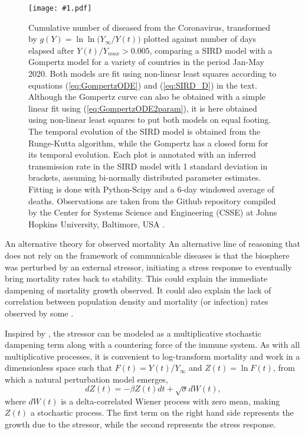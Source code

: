 \documentclass{article}
\newcommand{\insertPdfFig}[3]{
  \begin{figure}[H]
  \centering
  \texttt{[image: \#1.pdf]}
  \caption{#2}
  \label{fig:#1}
  \end{figure}
}
\begin{document}
\insertPdfFig{Gompertz_vs_SIRD_lnln_infty}{Cumulative number of diseased from the Coronavirus, transformed by $g(Y)=\ln{\ln{({Y_{\infty} / Y(t))}}}$ plotted against number of days elapsed after $Y(t) / Y_{max}>0.005$, comparing a SIRD model with a Gompertz model for a variety of countries in the period Jan-May 2020. Both models are fit using non-linear least squares according to equations (\ref{eq:GompertzODE}) and (\ref{eq:SIRD_D}) in the text. Although the Gompertz curve can also be obtained with a simple linear fit using (\ref{eq:GompertzODE2param}), it is here obtained using non-linear least squares to put both models on equal footing. The temporal evolution of the SIRD model is obtained from the Runge-Kutta algorithm, while the Gompertz has a closed form for its temporal evolution. Each plot is annotated with an inferred transmission rate in the SIRD model with 1 standard deviation in brackets, assuming bi-normally distributed parameter estimates. Fitting is done with Python-Scipy and a 6-day windowed average of deaths. Observations are taken from the Github repository compiled by the Center for Systems Science and Engineering (CSSE) at Johns Hopkins University, Baltimore, USA \citep{dong2020interactive}.} 

\section{An alternative theory for observed mortality}
\label{seq:alt}
An alternative line of reasoning that does not rely on the framework of communicable diseases is that the biosphere was perturbed by an external stressor, initiating a stress response to eventually bring mortality rates back to stability. 
This could explain the immediate dampening of mortality growth observed. 
It could also explain the lack of correlation between population density and mortality (or infection) rates observed by some \citep{Hamidi2020,Hamidi2020a,Carozzi2020,Arpino2020,khavarian2021high,barak2021urban}.

Inspired by \citet{de2014stochastic}, the stressor can be modeled as a multiplicative stochastic dampening term along with a countering force of the immune system. 
As with all multiplicative processes, it is convenient to log-transform mortality and work in a dimensionless space such that $F(t)=Y(t)/Y_\infty$ and $Z(t)=\ln{F}(t)$, from which a natural perturbation model emerges,
\begin{equation}
\label{eq:microscopic}
dZ(t)= -\beta Z(t) dt + \sqrt{\sigma}dW(t),
\end{equation}
where $dW(t)$ is a delta-correlated Wiener process with zero mean, making $Z(t)$ a stochastic process. The first term on the right hand side represents the growth due to the stressor, while the second represents the stress response.  
\end{document}
